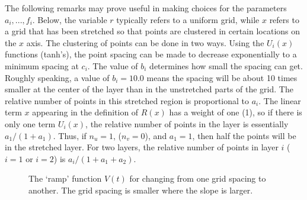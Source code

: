 The following remarks may prove useful in making choices for the
parameters $a_i, ... ,f_i$.  Below, the variable $r$ typically refers
to a uniform grid, while $x$ refers to a grid that has been stretched
so that points are clustered in certain locations on the $x$ axis.
The clustering of points can be done in two ways.  Using the $U_i(x)$
functions (tanh's), the point spacing can be made to decrease
exponentially to a minimum spacing at $c_i$.  The value of $b_i$
determines how small the spacing can get.  Roughly speaking, a value
of $b_i=10.0$ means the spacing will be about 10 times smaller at the
center of the layer than in the unstretched parts of the grid.  The
relative number of points in this stretched region is proportional to
$a_i$.  The linear term $x$ appearing in the definition of $R(x)$ has
a weight of one (1), so if there is only one term $U_i(x)$, the
relative number of points in the layer is essentially $a_1 / (1+a_1)$.
Thus, if $n_u=1$, ($n_v=0$), and $a_1=1$, then half the points will be
in the stretched layer.  For two layers, the relative number of points
in layer $i$ ($i=1$ or $i=2$) is $ a_i / (1+a_1+a_2)$.
\begin{figure}[hbt]
\newcommand{\figWidth}{12cm}
\newcommand{\trimfig}[2]{\trimFig{#1}{#2}{0.1}{.1}{.175}{.6}}
\begin{center}\small
  \caption{The `ramp' function $V(t)$ for changing from one grid spacing to another. The grid spacing
      is smaller where the slope is larger.} \label{fig:stretchV}
\end{center}
\end{figure}
